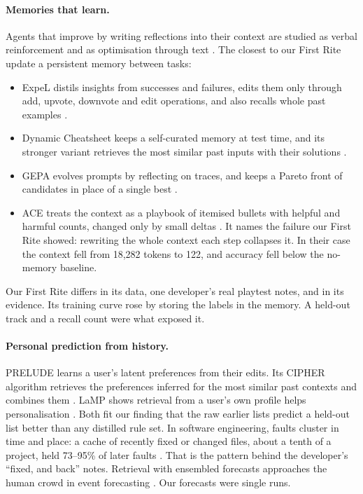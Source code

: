 \documentclass[10pt]{article}
\begin{document}
\paragraph{Memories that learn.} Agents that improve by writing reflections into their context are studied as verbal reinforcement \citep{shinn2023reflexion} and as optimisation through text \citep{yuksekgonul2024textgrad, yang2023opro, khattab2023dspy}. The closest to our First Rite update a persistent memory between tasks:
\begin{itemize}[leftmargin=*]
  \item ExpeL distils insights from successes and failures, edits them only through add, upvote, downvote and edit operations, and also recalls whole past examples \citep{zhao2024expel}.
  \item Dynamic Cheatsheet keeps a self-curated memory at test time, and its stronger variant retrieves the most similar past inputs with their solutions \citep{suzgun2026dynamic}.
  \item GEPA evolves prompts by reflecting on traces, and keeps a Pareto front of candidates in place of a single best \citep{agrawal2026gepa}.
  \item ACE treats the context as a playbook of itemised bullets with helpful and harmful counts, changed only by small deltas \citep{zhang2026ace}. It names the failure our First Rite showed: rewriting the whole context each step collapses it. In their case the context fell from 18,282 tokens to 122, and accuracy fell below the no-memory baseline.
\end{itemize}
Our First Rite differs in its data, one developer's real playtest notes, and in its evidence. Its training curve rose by storing the labels in the memory. A held-out track and a recall count were what exposed it.

\paragraph{Personal prediction from history.} PRELUDE learns a user's latent preferences from their edits. Its CIPHER algorithm retrieves the preferences inferred for the most similar past contexts and combines them \citep{gao2024aligning}. LaMP shows retrieval from a user's own profile helps personalisation \citep{salemi2024lamp}. Both fit our finding that the raw earlier lists predict a held-out list better than any distilled rule set. In software engineering, faults cluster in time and place: a cache of recently fixed or changed files, about a tenth of a project, held 73--95\% of later faults \citep{kim2007predicting}. That is the pattern behind the developer's ``fixed, and back'' notes. Retrieval with ensembled forecasts approaches the human crowd in event forecasting \citep{halawi2024approaching}. Our forecasts were single runs.
\end{document}
